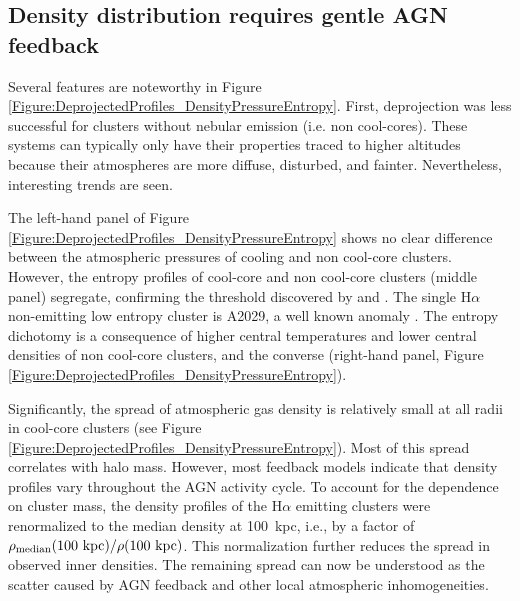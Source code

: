\documentclass[twocolumn]{aastex6}
\begin{document}
\subsection{Density distribution requires gentle AGN feedback} \label{Section:DensitySwings}


Several features are noteworthy in Figure \ref{Figure:DeprojectedProfiles_DensityPressureEntropy}.  First, deprojection was less successful for clusters without nebular emission (i.e. non cool-cores).  These systems can typically only have their properties traced to higher altitudes because their atmospheres are more diffuse, disturbed, and fainter.  Nevertheless, interesting trends are seen.

The left-hand panel of Figure \ref{Figure:DeprojectedProfiles_DensityPressureEntropy} shows no clear difference between the atmospheric pressures of cooling and non cool-core clusters. However, the entropy profiles of cool-core and non cool-core clusters (middle panel) segregate, confirming the threshold discovered by \citet[][]{Rafferty08} and \citet[][]{Cavagnolo08}. The single H$\alpha$ non-emitting low entropy cluster is A2029, a well known anomaly \cite[see e.g.][]{McNamara16}.  The entropy dichotomy is a consequence of higher central temperatures and lower central densities of non cool-core clusters, and the converse (right-hand panel, Figure \ref{Figure:DeprojectedProfiles_DensityPressureEntropy}).

Significantly, the spread of atmospheric gas density is relatively small at all radii in cool-core clusters (see Figure \ref{Figure:DeprojectedProfiles_DensityPressureEntropy}).  Most of this spread correlates with halo mass.  However, most feedback models indicate that density profiles vary throughout the AGN activity cycle.  To account for the dependence on cluster mass, the density profiles of the H$\alpha$ emitting clusters were renormalized to the median density at 100~kpc, i.e., by a factor of $\rho_{\rm median}(100\rm\ kpc) / \rho(100\rm\ kpc)$.  This normalization further reduces the spread in observed inner densities.  The remaining spread can now be understood as the scatter caused by AGN feedback and other local atmospheric inhomogeneities.
\end{document}
